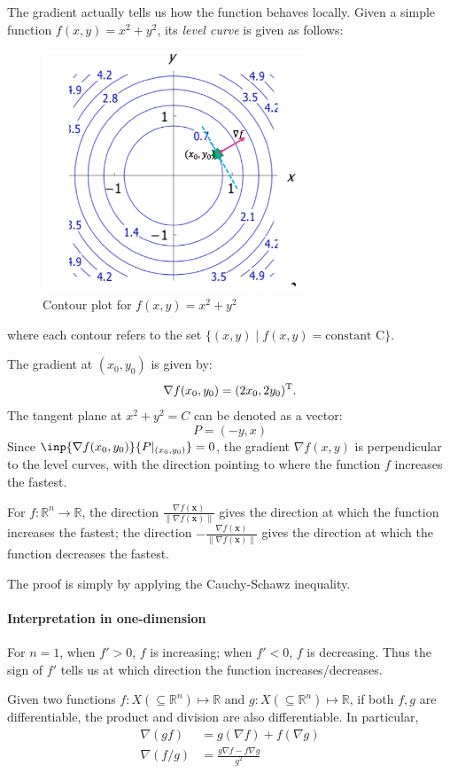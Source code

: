 \begin{example}
The gradient actually tells us how the function behaves locally. Given a simple function $f(x,y)=x^2+y^2$, its \emph{level curve} is given as follows:
\begin{figure}[H]
\centering\includegraphics[width=8cm]{week10/f_10_2}
\caption{Contour plot for $f(x,y)=x^2+y^2$}
\end{figure}
where each contour refers to the set $\{(x,y)\mid f(x,y) = \mbox{constant C}\}$.

The gradient at $(x_0,y_0)$ is given by:
\[
\nabla f(x_0,y_0) = (2x_0,2y_0)^{\mathrm T}.
\]
The tangent plane at $x^2+y^2=C$ can be denoted as a vector:
\[
P=(-y,x)
\]
Since $\inp{\nabla f(x_0,y_0)}{P|_{(x_0,y_0)}}=0$, the gradient $\nabla f(x,y)$ is perpendicular to the level curves, with the direction pointing to where the function $f$ increases the fastest.
\end{example}
\begin{proposition}
For $f:\mathbb{R}^n\to\mathbb{R}$, the direction $\frac{\nabla f(\bm x)}{\|\nabla f(\bm x)\|}$ gives the direction at which the function increases the fastest; the direction $-\frac{\nabla f(\bm x)}{\|\nabla f(\bm x)\|}$ gives the direction at which the function decreases the fastest.
\end{proposition}
The proof is simply by applying the Cauchy-Schawz inequality.
\paragraph{Interpretation in one-dimension} For $n=1$, when $f'>0$, $f$ is increasing; when $f'<0$, $f$ is decreasing. Thus the sign of $f'$ tells us at which direction the function increases/decreases. 
\begin{proposition}
Given two functions $f:X(\subseteq\mathbb{R}^n)\mapsto\mathbb{R}$ and $g:X(\subseteq\mathbb{R}^n)\mapsto\mathbb{R}$, if both $f,g$ are differentiable, the product and division are also differentiable. In particular,
\begin{align*}
\nabla (gf)&=g(\nabla f)+f(\nabla g)\\
\nabla(f/g)&=\frac{g\nabla f - f\nabla g}{g^2}
\end{align*}
\end{proposition}


